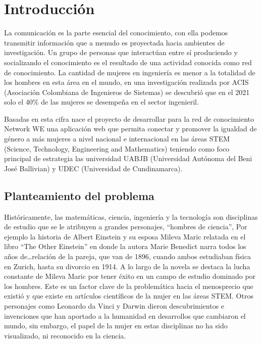 \documentclass[hidelinks]{Documento}
\begin{document}
\tableofcontents
{}
{\noskip\listoffigures} 
{\noskip\listoftables} 


\mainmatter

\selectfont
\chapter{Introducción}
La comunicación es la parte esencial del conocimiento, con ella podemos transmitir información que a menudo es proyectada hacia ambientes de investigación. Un grupo de personas que interactúan entre sí produciendo y socializando el conocimiento es el resultado de una actividad conocida como red de conocimiento.  La cantidad de mujeres en ingeniería es menor a la totalidad de los hombres en esta área en el mundo, en una investigación realizada por ACIS (Asociación Colombiana de Ingenieros de Sistemas) se descubrió que en el 2021 solo el 40\% de las mujeres se desempeña en el sector ingenieril. 

Basadas en esta cifra nace el proyecto de desarrollar para la red de conocimiento Network WE una aplicación web que permita conectar y promover la igualdad de género a más mujeres a nivel nacional e internacional en las áreas STEM (Science, Technology, Engineering and Mathematics) teniendo como foco principal de estrategia las universidad UABJB (Universidad Autónoma del Beni José Ballivian) y UDEC (Universidad de Cundinamarca).


\section{Planteamiento del problema}

Históricamente, las matemáticas, ciencia, ingeniería y la tecnología son disciplinas de estudio que se le atribuyen a grandes personajes, “hombres de ciencia”, Por ejemplo la historia de Albert Einstein y su esposa Mileva Maric relatada en el libro “The Other Einstein” en donde la autora Marie Benedict narra todos los años de…relación de la pareja, que van de 1896, cuando ambos estudiaban física en Zurich, hasta su divorcio en 1914. A lo largo de la novela se destaca la lucha constante de Mileva Maric por tener éxito en un campo de estudio dominado por los hombres. \cite{Benedict2018} Este es un factor clave de la problemática hacia el menosprecio que existió y que existe en artículos científicos de la mujer en las áreas STEM. Otros personajes como Leonardo da Vinci y Darwin dieron descubrimientos e invenciones que han aportado a la humanidad en desarrollos que cambiaron el mundo, sin embargo, el papel de la mujer en estas disciplinas no ha sido visualizado, ni reconocido en la ciencia.
\end{document}
